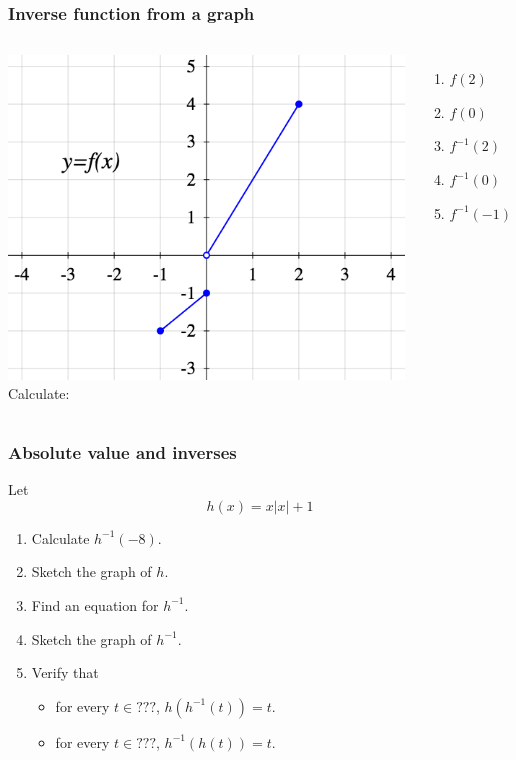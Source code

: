 \documentclass[14pt]{beamer}
\newcommand {\DS} [1] {${\displaystyle #1}$}
\newcommand{\p}{\pause}
\begin{document}
\begin{frame}
\frametitle{Inverse function from a graph}

\begin{columns}[c]

\includegraphics[scale=.4]{G12}
Calculate:
\begin{enumerate}
	\item  \DS{f(2)}
	\item  \DS{f(0)}
	\item  \DS{f^{-1}(2)}
	\item  \DS{f^{-1}(0)}
	\item  \DS{f^{-1}(-1)}
\end{enumerate}
\end{columns}

\end{frame}

\begin{frame}[t]
\frametitle{Absolute value and inverses}

Let
	$$
		h(x) = x |x| + 1
	$$
\begin{enumerate}
	\item  Calculate \DS{h^{-1}(-8)}.
\p
	\item Sketch the graph of $h$.
	\item  Find an equation for \DS{h^{-1}}.
	\item Sketch the graph of \DS{h^{-1}}.
	\item  Verify that
		\begin{itemize} \normalsize
			\item  for every \DS{t \in \boxed{???}}, \; \DS{h(h^{-1}(t)) = t}.
			\item for every \DS{t \in \boxed{???}}, \; \DS{h^{-1}(h(t)) = t}.
		\end{itemize}
\end{enumerate}

\end{frame}
\end{document}
